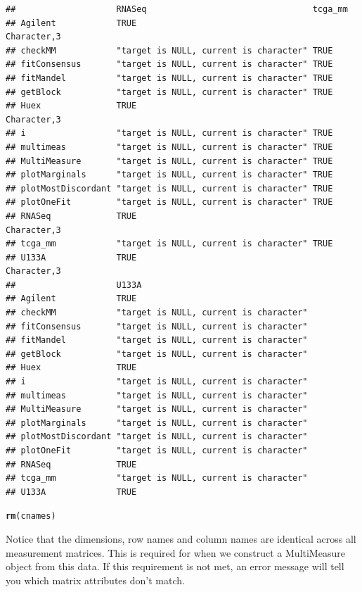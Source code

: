 \documentclass{article}\usepackage[]{graphicx}\usepackage[]{color}
\makeatletter
\newcommand{\hlstd}[1]{\textcolor[rgb]{0.345,0.345,0.345}{#1}}%
\newcommand{\hlkwd}[1]{\textcolor[rgb]{0.737,0.353,0.396}{\textbf{#1}}}%
\newenvironment{kframe}{%
 \def\at@end@of@kframe{}%
 \ifinner\ifhmode%
  \def\at@end@of@kframe{\end{minipage}}%
  \begin{minipage}{\columnwidth}%
 \fi\fi%
 \def\FrameCommand##1{\hskip\@totalleftmargin \hskip-\fboxsep
 \colorbox{shadecolor}{##1}\hskip-\fboxsep
     \hskip-\linewidth \hskip-\@totalleftmargin \hskip\columnwidth}%
 \MakeFramed {\advance\hsize-\width
   \@totalleftmargin\z@ \linewidth\hsize
   \@setminipage}}%
 {\par\unskip\endMakeFramed%
 \at@end@of@kframe}
\newenvironment{knitrout}{}{} %
\makeatother
\begin{document}
\begin{knitrout}
\begin{kframe}
\begin{verbatim}
##                    RNASeq                                 tcga_mm    
## Agilent            TRUE                                   Character,3
## checkMM            "target is NULL, current is character" TRUE       
## fitConsensus       "target is NULL, current is character" TRUE       
## fitMandel          "target is NULL, current is character" TRUE       
## getBlock           "target is NULL, current is character" TRUE       
## Huex               TRUE                                   Character,3
## i                  "target is NULL, current is character" TRUE       
## multimeas          "target is NULL, current is character" TRUE       
## MultiMeasure       "target is NULL, current is character" TRUE       
## plotMarginals      "target is NULL, current is character" TRUE       
## plotMostDiscordant "target is NULL, current is character" TRUE       
## plotOneFit         "target is NULL, current is character" TRUE       
## RNASeq             TRUE                                   Character,3
## tcga_mm            "target is NULL, current is character" TRUE       
## U133A              TRUE                                   Character,3
##                    U133A                                 
## Agilent            TRUE                                  
## checkMM            "target is NULL, current is character"
## fitConsensus       "target is NULL, current is character"
## fitMandel          "target is NULL, current is character"
## getBlock           "target is NULL, current is character"
## Huex               TRUE                                  
## i                  "target is NULL, current is character"
## multimeas          "target is NULL, current is character"
## MultiMeasure       "target is NULL, current is character"
## plotMarginals      "target is NULL, current is character"
## plotMostDiscordant "target is NULL, current is character"
## plotOneFit         "target is NULL, current is character"
## RNASeq             TRUE                                  
## tcga_mm            "target is NULL, current is character"
## U133A              TRUE
\end{verbatim}
\begin{alltt}
\hlkwd{rm}\hlstd{(cnames)}
\end{alltt}
\end{kframe}
\end{knitrout}

Notice that the dimensions, row names and column names are identical across all measurement matrices. This is required for when we construct a MultiMeasure object from this data. If this requirement is not met, an error message will tell you which matrix attributes don't match.
\end{document}
